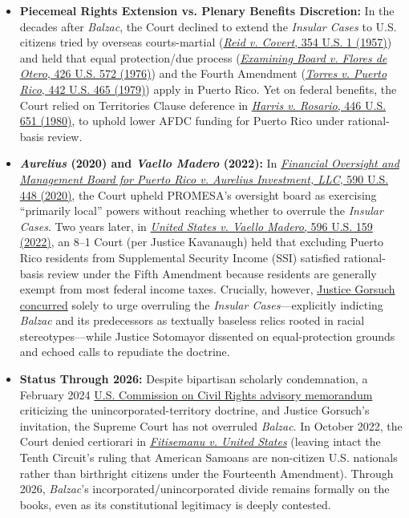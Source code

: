 \documentclass[12pt]{article}
\begin{document}
\begin{itemize}
  \item \textbf{Piecemeal Rights Extension vs. Plenary Benefits Discretion:} In the decades after \textit{Balzac}, the Court declined to extend the \textit{Insular Cases} to U.S. citizens tried by overseas courts-martial (\href{https://supreme.justia.com/cases/federal/us/354/1/}{\textit{Reid v. Covert}, 354 U.S. 1 (1957)}) and held that equal protection/due process (\href{https://supreme.justia.com/cases/federal/us/426/572/}{\textit{Examining Board v. Flores de Otero}, 426 U.S. 572 (1976)}) and the Fourth Amendment (\href{https://supreme.justia.com/cases/federal/us/442/465/}{\textit{Torres v. Puerto Rico}, 442 U.S. 465 (1979)}) apply in Puerto Rico. Yet on federal benefits, the Court relied on Territories Clause deference in \href{https://supreme.justia.com/cases/federal/us/446/651/}{\textit{Harris v. Rosario}, 446 U.S. 651 (1980)}, to uphold lower AFDC funding for Puerto Rico under rational-basis review.
  \item \textbf{\textit{Aurelius} (2020) and \textit{Vaello Madero} (2022):} In \href{https://supreme.justia.com/cases/federal/us/590/18-1334/}{\textit{Financial Oversight and Management Board for Puerto Rico v. Aurelius Investment, LLC}, 590 U.S. 448 (2020)}, the Court upheld PROMESA's oversight board as exercising ``primarily local'' powers without reaching whether to overrule the \textit{Insular Cases}. Two years later, in \href{https://www.law.cornell.edu/supremecourt/text/20-303}{\textit{United States v. Vaello Madero}, 596 U.S. 159 (2022)}, an 8--1 Court (per Justice Kavanaugh) held that excluding Puerto Rico residents from Supplemental Security Income (SSI) satisfied rational-basis review under the Fifth Amendment because residents are generally exempt from most federal income taxes. Crucially, however, \href{https://supreme.justia.com/cases/federal/us/596/20-303/}{Justice Gorsuch concurred} solely to urge overruling the \textit{Insular Cases}---explicitly indicting \textit{Balzac} and its predecessors as textually baseless relics rooted in racial stereotypes---while Justice Sotomayor dissented on equal-protection grounds and echoed calls to repudiate the doctrine.
  \item \textbf{Status Through 2026:} Despite bipartisan scholarly condemnation, a February 2024 \href{https://www.usccr.gov/files/2024-02/english_pr-ac_memo-1.pdf}{U.S. Commission on Civil Rights advisory memorandum} criticizing the unincorporated-territory doctrine, and Justice Gorsuch's invitation, the Supreme Court has not overruled \textit{Balzac}. In October 2022, the Court denied certiorari in \href{https://www.scotusblog.com/2022/10/court-declines-to-take-up-petition-seeking-to-overturn-insular-cases/}{\textit{Fitisemanu v. United States}} (leaving intact the Tenth Circuit's ruling that American Samoans are non-citizen U.S. nationals rather than birthright citizens under the Fourteenth Amendment). Through 2026, \textit{Balzac}'s incorporated/unincorporated divide remains formally on the books, even as its constitutional legitimacy is deeply contested.
\end{itemize}
\end{document}
